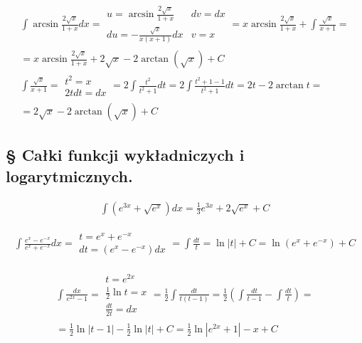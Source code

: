 
\begin{gather*}\int \arcsin \frac{2\sqrt{x}}{1+x}dx = \begin{array}{|ll|}
u=\arcsin \frac{2\sqrt{x}}{1+x} & dv=dx \\
du=-\frac{\sqrt{x}}{x(x+1)}dx & v=x
\end{array} = x\arcsin \frac{2\sqrt{x}}{1+x} + \int \frac{\sqrt{x}}{x+1} = \\ = x\arcsin \frac{2\sqrt{x}}{1+x} + 2\sqrt{x} - 2\arctan (\sqrt{x})+C \\
\int \frac{\sqrt{x}}{x+1} = \begin{array}{|l|}
t^2=x \\
2tdt=dx
\end{array} = 2\int \frac{t^2}{t^2+1}dt = 2\int \frac{t^2+1-1}{t^2+1}dt = 2t-2\arctan t = \\ = 2\sqrt{x}-2\arctan (\sqrt{x})+C\end{gather*}

\subsection{§ Całki funkcji wykładniczych i logarytmicznych.}


\begin{gather*}
  \int (e^{3x}+\sqrt{e^x})dx
  = \frac{1}{3}e^{3x}+2\sqrt{e^x}+C
\end{gather*}



\begin{gather*}\int \frac{e^x-e^{-x}}{e^x+e^{-x}}dx = \begin{array}{|l|} t=e^x+e^{-x} \\ dt=(e^x-e^{-x})dx \end{array} = \int \frac{dt}{t} = \ln|t|+C = \ln(e^x+e^{-x})+C\end{gather*}



\begin{gather*}\int \frac{dx}{e^{2x}-1} =\begin{array}{|l|}
t=e^{2x} \\
\frac{1}{2}\ln t = x \\
\frac{dt}{2t}=dx
\end{array}= \frac{1}{2}\int \frac{dt}{t(t-1)} = \frac{1}{2} \left(\int \frac{dt}{t-1} - \int \frac{dt}{t}\right) = \\ = \frac{1}{2}\ln|t-1|-\frac{1}{2}\ln|t|+C = \frac{1}{2}\ln|e^{2x}+1|-x+C\end{gather*}


